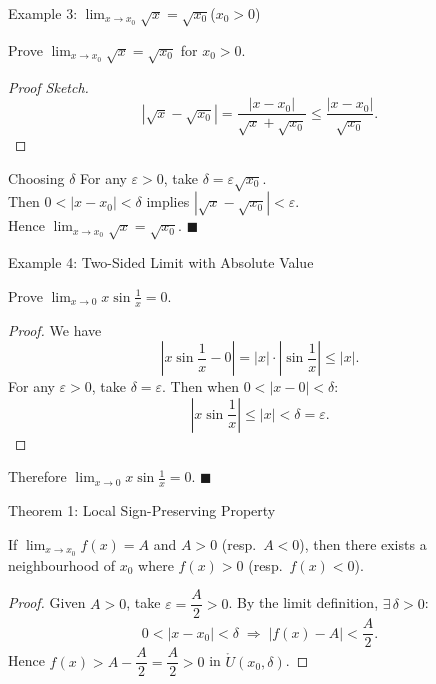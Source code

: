 \documentclass[aspectratio=169,10pt]{beamer}
\begin{document}
\begin{frame}{Example 3: $\displaystyle\lim_{x\to x_0}\sqrt{x}=\sqrt{x_0}$\;($x_0>0$)}
  \begin{example}
    Prove $\displaystyle\lim_{x\to x_0}\sqrt{x}=\sqrt{x_0}$ for $x_0>0$.
  \end{example}
  \pause
  \begin{proof}[Proof Sketch]
    \[
      |\sqrt{x}-\sqrt{x_0}| = \frac{|x-x_0|}{\sqrt{x}+\sqrt{x_0}}
      \leq \frac{|x-x_0|}{\sqrt{x_0}}.
    \]
  \end{proof}
  \pause
  \begin{block}{Choosing $\delta$}
    For any $\varepsilon>0$, take $\delta = \varepsilon\sqrt{x_0}$.\\[4pt]
    Then $0<|x-x_0|<\delta$ implies $|\sqrt{x}-\sqrt{x_0}| < \varepsilon$.\\[4pt]
    Hence $\displaystyle\lim_{x\to x_0}\sqrt{x}=\sqrt{x_0}$. \hfill$\blacksquare$
  \end{block}
\end{frame}

\begin{frame}{Example 4: Two-Sided Limit with Absolute Value}
  \begin{example}
    Prove $\displaystyle\lim_{x\to 0}x\sin\frac{1}{x}=0$.
  \end{example}
  \pause
  \begin{proof}[Proof]
    We have
    \[
      \left|x\sin\frac{1}{x}-0\right| = |x|\cdot\left|\sin\frac{1}{x}\right| \leq |x|.
    \]
    \pause
    For any $\varepsilon>0$, take $\delta = \varepsilon$.
    \pause
    Then when $0<|x-0|<\delta$:
    \[
      \left|x\sin\frac{1}{x}\right| \leq |x| < \delta = \varepsilon.
    \]
  \end{proof}
  \pause
  \begin{center}
    Therefore $\displaystyle\lim_{x\to 0}x\sin\frac{1}{x}=0$. \hfill$\blacksquare$
  \end{center}
\end{frame}

\begin{frame}{Theorem 1: Local Sign-Preserving Property}
  \begin{theorem}\label{thm:sign-preserve}
    If $\displaystyle\lim_{x\to x_0}f(x)=A$ and $A>0$ (resp.\ $A<0$),
    then there exists a neighbourhood of $x_0$ where $f(x)>0$ (resp.\ $f(x)<0$).
  \end{theorem}
  \pause
  \begin{proof}
    Given $A>0$, take $\varepsilon = \dfrac{A}{2}>0$.
    \pause
    By the limit definition, $\exists\,\delta>0$:
    \[
      0<|x-x_0|<\delta \;\Longrightarrow\; |f(x)-A|<\frac{A}{2}.
    \]
    \pause
    Hence $f(x) > A - \dfrac{A}{2} = \dfrac{A}{2} > 0$ in $\mathring{U}(x_0,\delta)$.
  \end{proof}
\end{frame}
\end{document}
